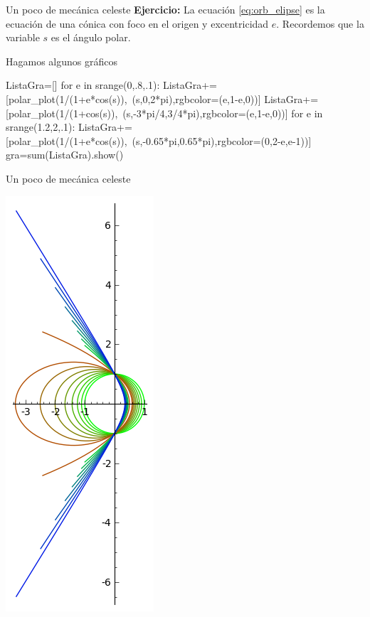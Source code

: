 \documentclass[handout,hyperref={colorlinks=true}]{beamer}
\begin{document}
\begin{frame}[fragile]{Un poco de mecánica celeste}
\textbf{Ejercicio:} La ecuación \eqref{eq:orb_elipse} es la ecuación de una cónica con foco en el origen y excentricidad $e$.
Recordemos que la variable $s$ es el ángulo polar. 

Hagamos algunos gráficos
 
\begin{sageblock}
ListaGra=[]
for e in srange(0,.8,.1):
    ListaGra+=[polar_plot(1/(1+e*cos(s)),\
    (s,0,2*pi),rgbcolor=(e,1-e,0))]
ListaGra+=[polar_plot(1/(1+cos(s)),\
(s,-3*pi/4,3/4*pi),rgbcolor=(e,1-e,0))]
for e in srange(1.2,2,.1):
    ListaGra+=[polar_plot(1/(1+e*cos(s)),\
    (s,-0.65*pi,0.65*pi),rgbcolor=(0,2-e,e-1))]
gra=sum(ListaGra).show()

\end{sageblock}

\end{frame}    

\begin{frame}[fragile]{Un poco de mecánica celeste}

\includegraphics[scale=.5]{imagenes/conicas.png}

\end{frame}  
\end{document}
